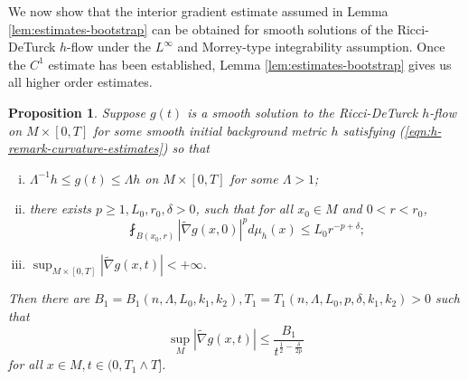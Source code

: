 \documentclass[12pt]{amsart}
\theoremstyle{plain}
\theoremstyle{plain}
\newtheorem{proposition}[subsection]{Proposition}
\theoremstyle{definition}
\theoremstyle{remark}
\numberwithin{equation}{subsection}
\newcommand{\hdel}{\tilde{\nabla}}
\begin{document}
We now show that the interior gradient estimate assumed in Lemma \ref{lem:estimates-bootstrap} can be obtained for smooth solutions of the Ricci-DeTurck $h$-flow under the $L^\infty$ and Morrey-type integrability assumption. Once the $C^1$ estimate has been established, Lemma \ref{lem:estimates-bootstrap} gives us all higher order estimates.

\begin{proposition}\label{prop:gradient-estimate}
    Suppose $g(t)$ is a smooth solution to the Ricci-DeTurck $h$-flow on $M \times [0,T]$ for some smooth initial background metric $h$ satisfying (\ref{eqn:h-remark-curvature-estimates}) so that
    \begin{enumerate}[(i)]
        \item $\Lambda^{-1}h \leq g(t) \leq \Lambda h$ on $M\times[0,T]$ for some $\Lambda > 1$;
        \item there exists $p \geq 1, L_0, r_0 ,\delta > 0$,  such that for all $x_0 \in M$ and $0 < r < r_0$,
        \begin{equation*}
            \fint_{B(x_0,r)} |\hdel g(x,0)|^p d\mu_h(x) \leq L_0r^{-p+\delta};
        \end{equation*}
        \item $\sup_{M\times [0,T]} |\tilde\nabla g(x,t)|<+\infty$.
    \end{enumerate}
    Then there are $B_1 = B_1(n,\Lambda,L_0,k_1,k_2), T_1 = T_1(n,\Lambda,L_0,p,\delta,k_1,k_2) > 0$ such that
    \begin{equation}\label{eqn:interior-gradient-estimate}
        \sup\limits_M|\hdel g(x,t)| \leq \frac{B_1}{t^{\frac{1}{2}-\frac{\delta}{2p}}}
    \end{equation}
    for all $x \in M, t \in (0, T_1\wedge T]$.
\end{proposition}
\end{document}
